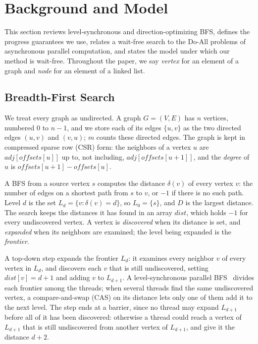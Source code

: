 \section{Background and Model}
\label{sec:background}

This section reviews level-synchronous and direction-optimizing BFS, defines the progress guarantees we use, relates a wait-free search to the Do-All problems of asynchronous parallel computation, and states the model under which our method is wait-free. Throughout the paper, we say \emph{vertex} for an element of a graph and \emph{node} for an element of a linked list.

\subsection{Breadth-First Search}
\label{sec:bg-bfs}

We treat every graph as undirected. A graph $G = (V, E)$ has $n$ vertices, numbered $0$ to $n-1$, and we store each of its edges $\{u, v\}$ as the two directed edges $(u, v)$ and $(v, u)$; $m$ counts these directed edges. The graph is kept in compressed sparse row (CSR) form: the neighbors of a vertex $u$ are $\mathit{adj}[\mathit{offsets}[u]]$ up to, not including, $\mathit{adj}[\mathit{offsets}[u+1]]$, and the \emph{degree} of $u$ is $\mathit{offsets}[u+1] - \mathit{offsets}[u]$.

A BFS from a source vertex $s$ computes the distance $\delta(v)$ of every vertex $v$: the number of edges on a shortest path from $s$ to $v$, or $-1$ if there is no such path. Level $d$ is the set $L_d = \{v : \delta(v) = d\}$, so $L_0 = \{s\}$, and $D$ is the largest distance. The search keeps the distances it has found in an array $\mathit{dist}$, which holds $-1$ for every undiscovered vertex. A vertex is \emph{discovered} when its distance is set, and \emph{expanded} when its neighbors are examined; the level being expanded is the \emph{frontier}.

A top-down step expands the frontier $L_d$: it examines every neighbor $v$ of every vertex in $L_d$, and discovers each $v$ that is still undiscovered, setting $\mathit{dist}[v] = d+1$ and adding $v$ to $L_{d+1}$. A level-synchronous parallel BFS~\cite{bader_bfs, charles_bfs} divides each frontier among the threads; when several threads find the same undiscovered vertex, a compare-and-swap (CAS) on its distance lets only one of them add it to the next level. The step ends at a barrier, since no thread may expand $L_{d+1}$ before all of it has been discovered: otherwise a thread could reach a vertex of $L_{d+1}$ that is still undiscovered from another vertex of $L_{d+1}$, and give it the distance $d+2$.

